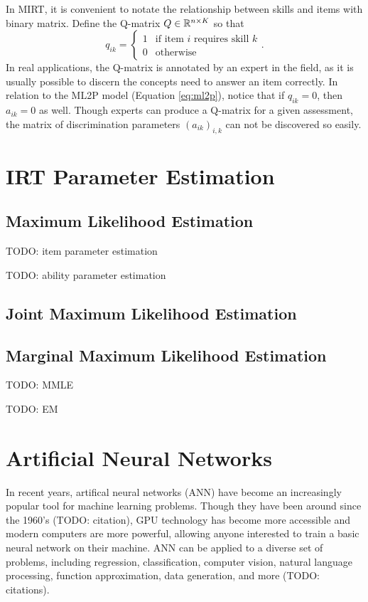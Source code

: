 In MIRT, it is convenient to notate the relationship between skills and items with binary matrix. Define the Q-matrix \cite{daSilva2018} $Q \in \mathbb{R}^{n\times K}$ so that 
\begin{equation}
  q_{ik} = \begin{cases}
    1 & \text{if item } i \text{ requires skill } k\\
    0 & \text{otherwise}
  \end{cases}.
  \label{eq:q_matrix}
\end{equation}
In real applications, the Q-matrix is annotated by an expert in the field, as it is usually possible to discern the concepts need to answer an item correctly. In relation to the ML2P model (Equation \ref{eq:ml2p}), notice that if $q_{ik} = 0$, then $a_{ik} = 0$ as well. Though experts can produce a Q-matrix for a given assessment, the matrix of discrimination parameters $(a_{ik})_{i,k}$ can not be discovered so easily.

\section{IRT Parameter Estimation}

\subsection{Maximum Likelihood Estimation}
TODO: item parameter estimation

TODO: ability parameter estimation

\subsection{Joint Maximum Likelihood Estimation}


\subsection{Marginal Maximum Likelihood Estimation}
TODO: MMLE

TODO: EM 

\section{Artificial Neural Networks}
In recent years, artifical neural networks (ANN) have become an increasingly popular tool for machine learning problems. Though they have been around since the 1960's (TODO: citation), GPU technology has become more accessible and modern computers are more powerful, allowing anyone interested to train a basic neural network on their machine. ANN can be applied to a diverse set of problems, including regression, classification, computer vision, natural language processing, function approximation, data generation, and more (TODO: citations).

